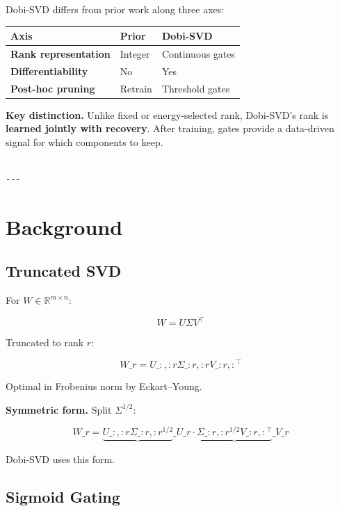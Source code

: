 Dobi-SVD differs from prior work along three axes:

\begin{table}[H]
\centering
\small
\begin{tabular}{lll}
\toprule
\textbf{Axis} & \textbf{Prior} & \textbf{Dobi-SVD} \\
\midrule
\textbf{Rank representation} & Integer & Continuous gates \\
\textbf{Differentiability} & No & Yes \\
\textbf{Post-hoc pruning} & Retrain & Threshold gates \\
\bottomrule
\end{tabular}
\end{table}

\textbf{Key distinction.} Unlike fixed or energy-selected rank, Dobi-SVD's rank 
is \textbf{learned jointly with recovery}. After training, gates provide a 
data-driven signal for which components to keep.
\begin{lstlisting}

---
\end{lstlisting}


\section{Background}

\subsection{Truncated SVD}

For $W \in \mathbb{R}^{m \times n}$:

\[
W = U \Sigma V^\top
\tag{3.1}
\]

Truncated to rank $r$:

\[
W\_r = U\_{:, :r} \Sigma\_{:r, :r} V\_{:r, :}^\top
\tag{3.2}
\]

Optimal in Frobenius norm by Eckart--Young.

\textbf{Symmetric form.} Split $\Sigma^{1/2}$:

\[
W\_r = \underbrace{U\_{:, :r} \Sigma\_{:r, :r}^{1/2}}\_{U\_r} \cdot \underbrace{\Sigma\_{:r, :r}^{1/2} V\_{:r, :}^\top}\_{V\_r}
\tag{3.3}
\]

Dobi-SVD uses this form.

\subsection{Sigmoid Gating}

